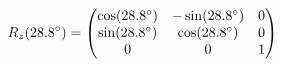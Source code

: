\documentclass[preview]{standalone}
\begin{document}
\begin{align*}
\special{dvisvgm:raw <g id='unique000'>}R_z(28.8^\circ) = \begin{pmatrix} \cos(28.8^\circ) & -\sin(28.8^\circ) & 0 \\ \sin(28.8^\circ) & \cos(28.8^\circ) & 0 \\ 0 & 0 & 1 \end{pmatrix}\special{dvisvgm:raw </g>}
\end{align*}
\end{document}
